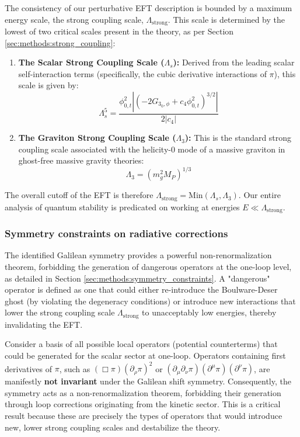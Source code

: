 \documentclass[twocolumn]{aastex631}
\begin{document}
The consistency of our perturbative EFT description is bounded by a maximum energy scale, the strong coupling scale, $\Lambda_{\text{strong}}$. This scale is determined by the lowest of two critical scales present in the theory, as per Section \ref{sec:methods:strong_coupling}:
\begin{enumerate}
    \item \textbf{The Scalar Strong Coupling Scale ($\Lambda_s$):} Derived from the leading scalar self-interaction terms (specifically, the cubic derivative interactions of $\pi$), this scale is given by:
    \begin{equation*}
    \Lambda_s^5 = \frac{\phi_{0,t}^2 |(-2G_{3_0,\phi} + c_4 \phi_{0,t}^2)^{3/2}|}{2|c_4|}
    \end{equation*}
    \item \textbf{The Graviton Strong Coupling Scale ($\Lambda_3$):} This is the standard strong coupling scale associated with the helicity-0 mode of a massive graviton in ghost-free massive gravity theories:
    \begin{equation*}
    \Lambda_3 = (m_g^2 M_P)^{1/3}
    \end{equation*}
\end{enumerate}
The overall cutoff of the EFT is therefore $\Lambda_{\text{strong}} = \text{Min}(\Lambda_s, \Lambda_3)$. Our entire analysis of quantum stability is predicated on working at energies $E \ll \Lambda_{\text{strong}}$.

\subsubsection{Symmetry constraints on radiative corrections}
The identified Galilean symmetry provides a powerful non-renormalization theorem, forbidding the generation of dangerous operators at the one-loop level, as detailed in Section \ref{sec:methods:symmetry_constraints}. A "dangerous" operator is defined as one that could either re-introduce the Boulware-Deser ghost (by violating the degeneracy conditions) or introduce new interactions that lower the strong coupling scale $\Lambda_{\text{strong}}$ to unacceptably low energies, thereby invalidating the EFT.

Consider a basis of all possible local operators (potential counterterms) that could be generated for the scalar sector at one-loop. Operators containing first derivatives of $\pi$, such as $(\Box\pi)(\partial_\rho\pi)^2$ or $(\partial_\mu\partial_\nu\pi)(\partial^\mu\pi)(\partial^\nu\pi)$, are manifestly \textbf{not invariant} under the Galilean shift symmetry. Consequently, the symmetry acts as a non-renormalization theorem, forbidding their generation through loop corrections originating from the kinetic sector. This is a critical result because these are precisely the types of operators that would introduce new, lower strong coupling scales and destabilize the theory.
\end{document}
